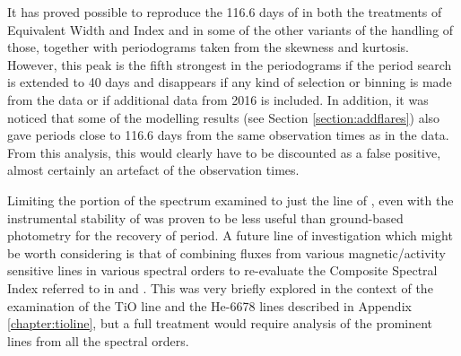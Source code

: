 It has proved possible to reproduce the 116.6 days of \citet[Table 3]{suarezmascareno15} in both the treatments of
Equivalent Width and {\ha} Index and in some of the other variants of the handling of those, together with periodograms
taken from the skewness and kurtosis. However, this peak is the fifth strongest in the periodograms if the period search
is extended to 40 days and disappears if any kind of selection or binning is made from the data or if additional data
from 2016 is included. In addition, it was noticed that some of the modelling results (see Section
\ref{section:addflares}) also gave periods close to 116.6 days from the same observation times as in the {\harps}
data. From this analysis, this would clearly have to be discounted as a false positive, almost certainly an artefact of
the observation times.

Limiting the portion of the spectrum examined to just the {\ha} line of \prox, even with the instrumental stability of
{\harps} was proven to be less useful than {\asas} ground-based photometry for the recovery of period. A future line of
investigation which might be worth considering is that of combining fluxes from various magnetic/activity sensitive
lines in various spectral orders to re-evaluate the Composite Spectral Index referred to in \citet{hall99} and
\citet{hall00}. This was very briefly explored in the context of the examination of the TiO line and the He-6678 lines
described in Appendix \ref{chapter:tioline}, but a full treatment would require analysis of the prominent lines from all
the spectral orders.

